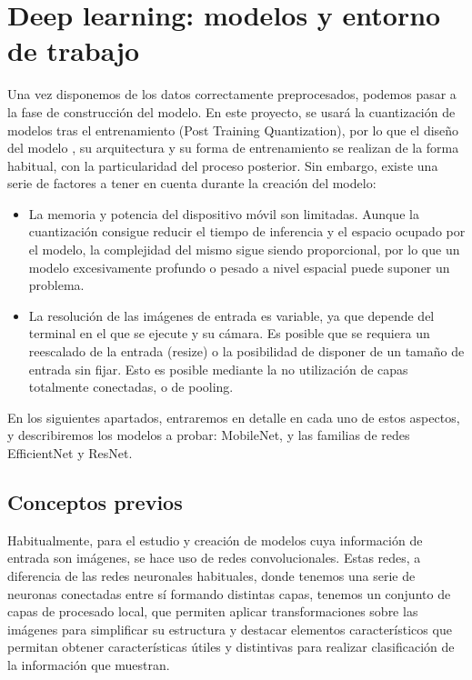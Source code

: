 \chapter{Deep learning: modelos y entorno de trabajo}

Una vez disponemos de los datos correctamente preprocesados, podemos pasar a la fase de construcción del modelo. En este proyecto, se usará la cuantización de modelos tras el entrenamiento (Post Training Quantization), por lo que el diseño del modelo , su arquitectura y su forma de entrenamiento se realizan de la forma habitual, con la particularidad del proceso posterior. Sin embargo, existe una serie de factores a tener en cuenta durante la creación del modelo:

\begin{itemize}
	\item La memoria y potencia del dispositivo móvil son limitadas. Aunque la cuantización consigue reducir el tiempo de inferencia y el espacio ocupado por el modelo, la complejidad del mismo sigue siendo proporcional, por lo que un modelo excesivamente profundo o pesado a nivel espacial puede suponer un problema.
	\item La resolución de las imágenes de entrada es variable, ya que depende del terminal en el que se ejecute y su cámara. Es posible que se requiera un reescalado de la entrada (resize) o la posibilidad de disponer de un tamaño de entrada sin fijar. Esto es posible mediante la no utilización de capas totalmente conectadas, o de pooling.
\end{itemize}

En los siguientes apartados, entraremos en detalle en cada uno de estos aspectos, y describiremos los modelos a probar: MobileNet, y las familias de redes EfficientNet y ResNet.

\section{Conceptos previos}

Habitualmente, para el estudio y creación de modelos cuya información de entrada son imágenes, se hace uso de redes convolucionales. Estas redes, a diferencia de las redes neuronales habituales, donde tenemos una serie de neuronas conectadas entre sí formando distintas capas,  tenemos un conjunto de capas de procesado local, que permiten aplicar transformaciones sobre las imágenes para simplificar su estructura y destacar elementos característicos que permitan obtener características útiles y distintivas para realizar clasificación de la información que muestran.


